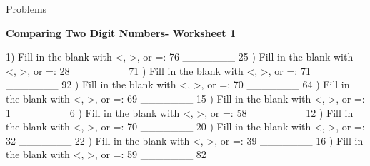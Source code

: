 \documentclass{article}%
\begin{document}
%
\huge%
\vspace*{\fill}%
\begin{center}%
Problems%
\end{center}%
\vspace*{\fill}%
\pagebreak%
\normalsize%
\large%
\begin{center}%
\textbf{Comparing Two Digit Numbers- Worksheet 1}%
\newline%
\end{center} \normalsize%
1) Fill in the blank with <, >, or =: 76 \_\_\_\_\_\_\_ 25%
\newline%
\newline%
) Fill in the blank with <, >, or =: 28 \_\_\_\_\_\_\_ 71%
\newline%
\newline%
) Fill in the blank with <, >, or =: 71 \_\_\_\_\_\_\_ 92%
\newline%
\newline%
) Fill in the blank with <, >, or =: 70 \_\_\_\_\_\_\_ 64%
\newline%
\newline%
) Fill in the blank with <, >, or =: 69 \_\_\_\_\_\_\_ 15%
\newline%
\newline%
) Fill in the blank with <, >, or =: 1 \_\_\_\_\_\_\_ 6%
\newline%
\newline%
) Fill in the blank with <, >, or =: 58 \_\_\_\_\_\_\_ 12%
\newline%
\newline%
) Fill in the blank with <, >, or =: 70 \_\_\_\_\_\_\_ 20%
\newline%
\newline%
) Fill in the blank with <, >, or =: 32 \_\_\_\_\_\_\_ 22%
\newline%
\newline%
) Fill in the blank with <, >, or =: 39 \_\_\_\_\_\_\_ 16%
\newline%
\newline%
) Fill in the blank with <, >, or =: 59 \_\_\_\_\_\_\_ 82%
\end{document}

